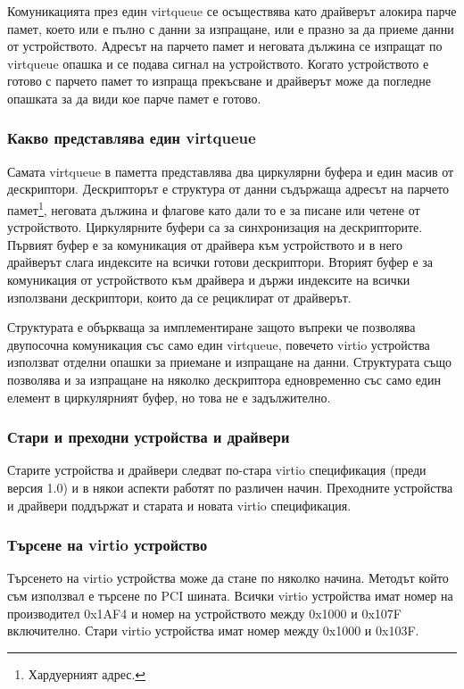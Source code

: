 Комуникацията през един virtqueue се осъществява като драйверът алокира парче памет, което или е пълно с данни за изпращане, или е празно за да приеме данни от устройството. Адресът на парчето памет и неговата дължина се изпращат по virtqueue опашка и се подава сигнал на устройството. Когато устройството е готово с парчето памет то изпраща прекъсване и драйверът може да погледне опашката за да види кое парче памет е готово.

\subsubsection{Какво представлява един virtqueue} \label{virtqueue}
Самата virtqueue в паметта представлява два циркулярни буфера и един масив от дескриптори. Дескрипторът е структура от данни съдържаща адресът на парчето памет\footnote{Хардуерният адрес.}, неговата дължина и флагове като дали то е за писане или четене от устройството. Циркулярните буфери са за синхронизация на дескрипторите. Първият буфер е за комуникация от драйвера към устройството и в него драйверът слага индексите на всички готови дескриптори. Вторият буфер е за комуникация от устройството към драйвера и държи индексите на всички използвани дескриптори, които да се рециклират от драйверът.

Структурата е объркваща за имплементиране защото въпреки че позволява двупосочна комуникация със само един virtqueue, повечето virtio устройства използват отделни опашки за приемане и изпращане на данни. Структурата също позволява и за изпращане на няколко дескриптора едновременно със само един елемент в циркулярният буфер, но това не е задължително.

\subsubsection{Стари и преходни устройства и драйвери}
Старите устройства и драйвери следват по-стара virtio спецификация (преди версия 1.0) и в някои аспекти работят по различен начин. Преходните устройства и драйвери поддържат и старата и новата virtio спецификация.

\subsubsection{Търсене на virtio устройство}
Търсенето на virtio устройства може да стане по няколко начина. Методът който съм използвал е търсене по PCI шината. Всички virtio устройства имат номер на производител 0x1AF4 и номер на устройството между 0x1000 и 0x107F включително. Стари virtio устройства имат номер между 0x1000 и 0x103F.

